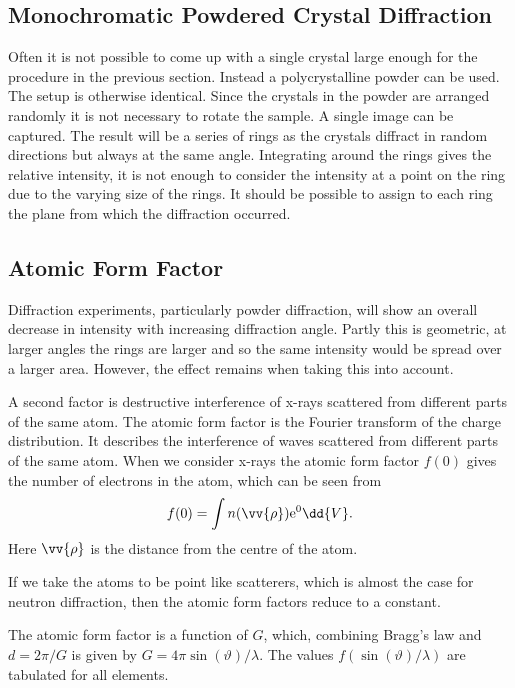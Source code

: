\documentclass[fleqn]{NotesClass}
\newcommand*{\e}{\mathrm{e}}
\begin{document}
    \subsection{Monochromatic Powdered Crystal Diffraction}
    Often it is not possible to come up with a single crystal large enough for the procedure in the previous section.
    Instead a polycrystalline powder can be used.
    The setup is otherwise identical.
    Since the crystals in the powder are arranged randomly it is not necessary to rotate the sample.
    A single image can be captured.
    The result will be a series of rings as the crystals diffract in random directions but always at the same angle.
    Integrating around the rings gives the relative intensity, it is not enough to consider the intensity at a point on the ring due to the varying size of the rings.
    It should be possible to assign to each ring the plane from which the diffraction occurred.
    
    \subsection{Atomic Form Factor}
    Diffraction experiments, particularly powder diffraction, will show an overall decrease in intensity with increasing diffraction angle.
    Partly this is geometric, at larger angles the rings are larger and so the same intensity would be spread over a larger area.
    However, the effect remains when taking this into account.
    
    A second factor is destructive interference of x-rays scattered from different parts of the same atom.
    The atomic form factor is the Fourier transform of the charge distribution.
    It describes the interference of waves scattered from different parts of the same atom.
    When we consider x-rays the atomic form factor \(f(0)\) gives the number of electrons in the atom, which can be seen from
    \begin{equation}
        f(0) = \int n(\vv{\rho}) \e^{0} \dd{V}.
    \end{equation}
    Here \(\vv{\rho}\) is the distance from the centre of the atom.
    
    If we take the atoms to be point like scatterers, which is almost the case for neutron diffraction, then the atomic form factors reduce to a constant.
    
    The atomic form factor is a function of \(G\), which, combining Bragg's law and \(d = 2\pi/G\) is given by \(G = 4\pi\sin(\vartheta)/\lambda\).
    The values \(f(\sin(\vartheta)/\lambda)\) are tabulated for all elements.
    
\end{document}
